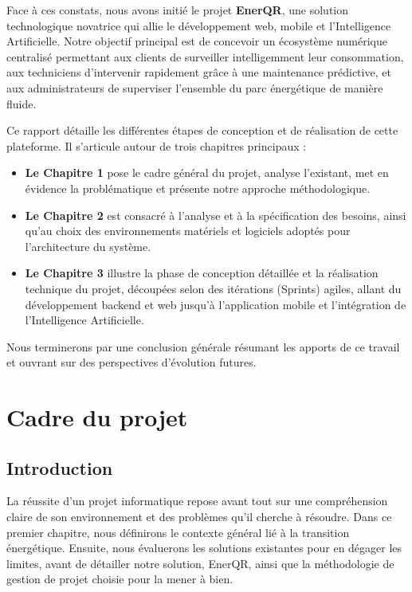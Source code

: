 \documentclass[12pt,a4paper]{report}
\begin{document}
Face à ces constats, nous avons initié le projet \textbf{EnerQR}, une solution technologique novatrice qui allie le développement web, mobile et l'Intelligence Artificielle. Notre objectif principal est de concevoir un écosystème numérique centralisé permettant aux clients de surveiller intelligemment leur consommation, aux techniciens d'intervenir rapidement grâce à une maintenance prédictive, et aux administrateurs de superviser l'ensemble du parc énergétique de manière fluide.

Ce rapport détaille les différentes étapes de conception et de réalisation de cette plateforme. Il s'articule autour de trois chapitres principaux :
\begin{itemize}
    \item \textbf{Le Chapitre 1} pose le cadre général du projet, analyse l'existant, met en évidence la problématique et présente notre approche méthodologique.
    \item \textbf{Le Chapitre 2} est consacré à l'analyse et à la spécification des besoins, ainsi qu'au choix des environnements matériels et logiciels adoptés pour l'architecture du système.
    \item \textbf{Le Chapitre 3} illustre la phase de conception détaillée et la réalisation technique du projet, découpées selon des itérations (Sprints) agiles, allant du développement backend et web jusqu'à l'application mobile et l'intégration de l'Intelligence Artificielle.
\end{itemize}
Nous terminerons par une conclusion générale résumant les apports de ce travail et ouvrant sur des perspectives d'évolution futures.

\chapter{Cadre du projet}

\section*{Introduction}
La réussite d'un projet informatique repose avant tout sur une compréhension claire de son environnement et des problèmes qu'il cherche à résoudre. Dans ce premier chapitre, nous définirons le contexte général lié à la transition énergétique. Ensuite, nous évaluerons les solutions existantes pour en dégager les limites, avant de détailler notre solution, EnerQR, ainsi que la méthodologie de gestion de projet choisie pour la mener à bien.
\end{document}
